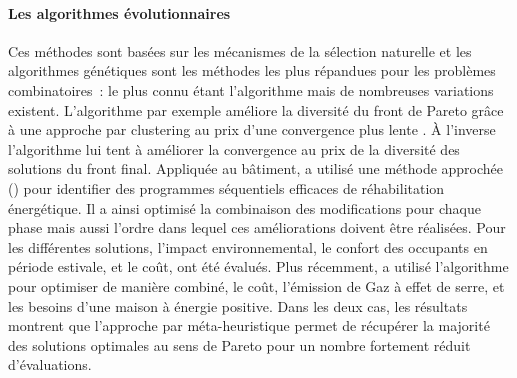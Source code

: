 \paragraph{Les algorithmes évolutionnaires} %
\label{par:les_algorithmes_evolutionnaires}
%
%
Ces méthodes sont basées sur les mécanismes de la sélection naturelle et les algorithmes
génétiques sont les méthodes les plus répandues pour les problèmes combinatoires~:
le plus connu étant l’algorithme 
\parencite{Deb2002182} mais de nombreuses variations existent. L’algorithme
 par exemple améliore la diversité du front de Pareto grâce à une approche
par clustering au prix d’une convergence plus lente \parencite{Zitzler2001}. À
l’inverse l’algorithme  lui tent à améliorer la convergence au prix
de la diversité des solutions du front final. Appliquée au bâtiment,
\textcite{Rivallain2013} a utilisé une méthode approchée () pour identifier
des programmes séquentiels efficaces de réhabilitation énergétique. Il a ainsi
optimisé la combinaison des modifications pour chaque phase mais aussi l’ordre
dans lequel ces améliorations doivent être réalisées. Pour les différentes
solutions, l’impact environnemental, le confort des occupants en période
estivale, et le coût, ont été évalués. Plus récemment, \textcite{Recht2016} a
utilisé l’algorithme  pour optimiser de manière combiné, le coût,
l’émission de Gaz à effet de serre, et les besoins d’une maison à énergie
positive. Dans les deux cas, les résultats montrent que l’approche par méta-heuristique
permet de récupérer la majorité des solutions optimales au sens de Pareto pour
un nombre fortement réduit d’évaluations.


